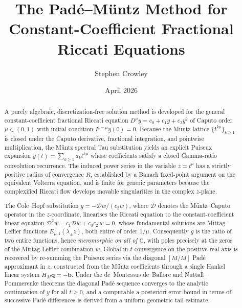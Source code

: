 \documentclass[12pt,a4paper]{amsart}
\newcommand{\ML}[2]{E_{#1,#2}}
\theoremstyle{plain}
\theoremstyle{definition}
\theoremstyle{remark}
\begin{document}
\title{The Pad\'e--M\"untz Method for\\
Constant-Coefficient Fractional Riccati Equations}
\author{Stephen Crowley}
\date{April 2026}
\maketitle

\begin{abstract}
A purely algebraic, discretization-free solution method is developed for the
general constant-coefficient fractional Riccati equation
$D^{\mu} y = c_0 + c_1 y + c_2 y^2$
of Caputo order $\mu \in (0,1)$ with initial condition $I^{1-\mu}y(0)=0$.
Because the M\"untz lattice $\{t^{k\mu}\}_{k\ge 1}$ is closed under the Caputo
derivative, fractional integration, and pointwise multiplication, the M\"untz
spectral Tau substitution yields an explicit Puiseux expansion
$y(t)=\sum_{k\ge 1}a_k t^{k\mu}$ whose coefficients satisfy a closed
Gamma-ratio convolution recurrence. The induced power series in the variable
$z=t^{\mu}$ has a strictly positive radius of convergence $R$, established by
a Banach fixed-point argument on the equivalent Volterra equation, and is
finite for generic parameters because the complexified Riccati flow develops
movable singularities in the complex $z$-plane.

The Cole--Hopf substitution $g=-\mathcal{D}w/(c_2 w)$, where $\mathcal{D}$
denotes the M\"untz--Caputo operator in the $z$-coordinate, linearises the
Riccati equation to the constant-coefficient linear equation
$\mathcal{D}^2 w - c_1\mathcal{D}w + c_0c_2\,w = 0$,
whose fundamental solutions are Mittag-Leffler functions $\ML{\mu}{1}(\lambda_\pm z)$,
both entire of order $1/\mu$. Consequently $g$ is the ratio of two entire
functions, hence \emph{meromorphic on all of $\mathbb{C}$}, with poles precisely
at the zeros of the Mittag-Leffler combination $w$.
Global-in-$t$ convergence on the positive real axis is recovered by re-summing
the Puiseux series via the diagonal $[M/M]$ Pad\'e approximant in $z$,
constructed from the M\"untz coefficients through a single Hankel linear
system $H_M\mathbf{q}=-\mathbf{b}$. Under the de~Montessus de~Ballore and
Nuttall--Pommerenke theorems the diagonal Pad\'e sequence converges to the
analytic continuation of $y$ for all $t\ge 0$, and a computable a-posteriori
error bound in terms of successive Pad\'e differences is derived from a
uniform geometric tail estimate.
\end{abstract}

\tableofcontents
\end{document}
